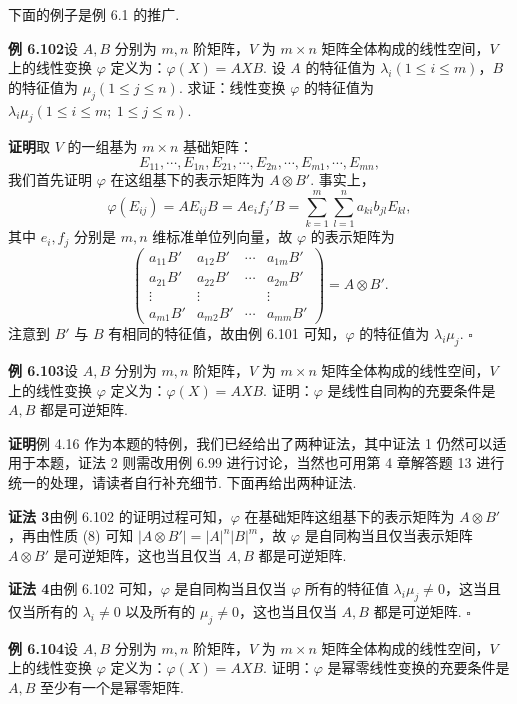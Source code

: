 \documentclass[UTF8,12pt,a4paper,fontset=fandol]{ctexart}
\begin{document}
下面的例子是例 6.1 的推广.

\noindent\textbf{例 6.102}\quad 设 $A,B$ 分别为 $m,n$ 阶矩阵，$V$ 为 $m\times n$ 矩阵全体构成的线性空间，$V$ 上的线性变换 $\varphi$ 定义为：$\varphi(X)=AXB$. 设 $A$ 的特征值为 $\lambda_i(1\le i\le m)$，$B$ 的特征值为 $\mu_j(1\le j\le n)$. 求证：线性变换 $\varphi$ 的特征值为 $\lambda_i\mu_j(1\le i\le m;\ 1\le j\le n)$.

\noindent\textbf{证明}\quad 取 $V$ 的一组基为 $m\times n$ 基础矩阵：
\[
E_{11},\cdots,E_{1n},E_{21},\cdots,E_{2n},\cdots,E_{m1},\cdots,E_{mn},
\]
我们首先证明 $\varphi$ 在这组基下的表示矩阵为 $A\otimes B'$. 事实上，
\[
\varphi(E_{ij})=AE_{ij}B=Ae_if_j'B=\sum_{k=1}^m\sum_{l=1}^n a_{ki}b_{jl}E_{kl},
\]
其中 $e_i,f_j$ 分别是 $m,n$ 维标准单位列向量，故 $\varphi$ 的表示矩阵为
\[
\begin{pmatrix}
a_{11}B'&a_{12}B'&\cdots&a_{1m}B'\\
a_{21}B'&a_{22}B'&\cdots&a_{2m}B'\\
\vdots&\vdots&&\vdots\\
a_{m1}B'&a_{m2}B'&\cdots&a_{mm}B'
\end{pmatrix}=A\otimes B'.
\]
注意到 $B'$ 与 $B$ 有相同的特征值，故由例 6.101 可知，$\varphi$ 的特征值为 $\lambda_i\mu_j$. $\square$

\noindent\textbf{例 6.103}\quad 设 $A,B$ 分别为 $m,n$ 阶矩阵，$V$ 为 $m\times n$ 矩阵全体构成的线性空间，$V$ 上的线性变换 $\varphi$ 定义为：$\varphi(X)=AXB$. 证明：$\varphi$ 是线性自同构的充要条件是 $A,B$ 都是可逆矩阵.

\noindent\textbf{证明}\quad 例 4.16 作为本题的特例，我们已经给出了两种证法，其中证法 1 仍然可以适用于本题，证法 2 则需改用例 6.99 进行讨论，当然也可用第 4 章解答题 13 进行统一的处理，请读者自行补充细节. 下面再给出两种证法.

\noindent\textbf{证法 3}\quad 由例 6.102 的证明过程可知，$\varphi$ 在基础矩阵这组基下的表示矩阵为 $A\otimes B'$，再由性质 (8) 可知 $|A\otimes B'|=|A|^n|B|^m$，故 $\varphi$ 是自同构当且仅当表示矩阵 $A\otimes B'$ 是可逆矩阵，这也当且仅当 $A,B$ 都是可逆矩阵.

\noindent\textbf{证法 4}\quad 由例 6.102 可知，$\varphi$ 是自同构当且仅当 $\varphi$ 所有的特征值 $\lambda_i\mu_j\ne 0$，这当且仅当所有的 $\lambda_i\ne 0$ 以及所有的 $\mu_j\ne 0$，这也当且仅当 $A,B$ 都是可逆矩阵. $\square$

\noindent\textbf{例 6.104}\quad 设 $A,B$ 分别为 $m,n$ 阶矩阵，$V$ 为 $m\times n$ 矩阵全体构成的线性空间，$V$ 上的线性变换 $\varphi$ 定义为：$\varphi(X)=AXB$. 证明：$\varphi$ 是幂零线性变换的充要条件是 $A,B$ 至少有一个是幂零矩阵.
\end{document}

